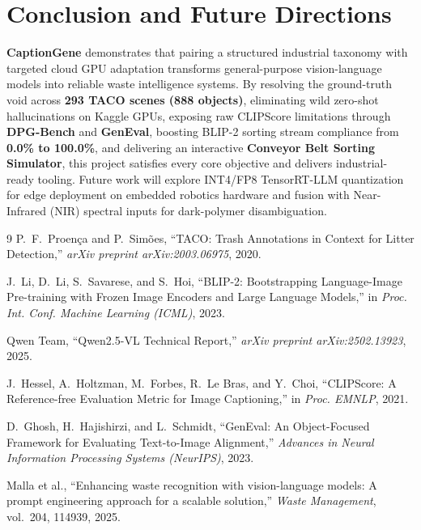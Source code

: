 \documentclass[11pt,a4paper]{article}
\begin{document}
\section{Conclusion and Future Directions}

\textbf{CaptionGene} demonstrates that pairing a structured industrial taxonomy with targeted cloud GPU adaptation transforms general-purpose vision-language models into reliable waste intelligence systems. By resolving the ground-truth void across \textbf{293 TACO scenes (888 objects)}, eliminating wild zero-shot hallucinations on Kaggle GPUs, exposing raw CLIPScore limitations through \textbf{DPG-Bench} and \textbf{GenEval}, boosting BLIP-2 sorting stream compliance from \textbf{0.0\% to 100.0\%}, and delivering an interactive \textbf{Conveyor Belt Sorting Simulator}, this project satisfies every core objective and delivers industrial-ready tooling. Future work will explore INT4/FP8 TensorRT-LLM quantization for edge deployment on embedded robotics hardware and fusion with Near-Infrared (NIR) spectral inputs for dark-polymer disambiguation.

\begin{thebibliography}{9}
P.~F.~Proen\c{c}a and P.~Sim\~{o}es, ``TACO: Trash Annotations in Context for Litter Detection,'' \textit{arXiv preprint arXiv:2003.06975}, 2020.

J.~Li, D.~Li, S.~Savarese, and S.~Hoi, ``BLIP-2: Bootstrapping Language-Image Pre-training with Frozen Image Encoders and Large Language Models,'' in \textit{Proc. Int. Conf. Machine Learning (ICML)}, 2023.

Qwen Team, ``Qwen2.5-VL Technical Report,'' \textit{arXiv preprint arXiv:2502.13923}, 2025.

J.~Hessel, A.~Holtzman, M.~Forbes, R.~Le Bras, and Y.~Choi, ``CLIPScore: A Reference-free Evaluation Metric for Image Captioning,'' in \textit{Proc. EMNLP}, 2021.

D.~Ghosh, H.~Hajishirzi, and L.~Schmidt, ``GenEval: An Object-Focused Framework for Evaluating Text-to-Image Alignment,'' \textit{Advances in Neural Information Processing Systems (NeurIPS)}, 2023.

Malla et al., ``Enhancing waste recognition with vision-language models: A prompt engineering approach for a scalable solution,'' \textit{Waste Management}, vol.~204, 114939, 2025.
\end{thebibliography}
\end{document}
